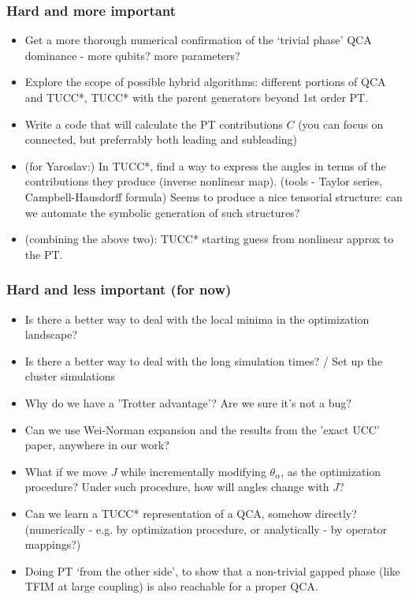 \documentclass[10pt, a4paper]{article}
\begin{document}
\subsubsection*{Hard and more important}
\begin{itemize}
\item Get a more thorough numerical confirmation of the `trivial phase' QCA dominance - more qubits? more parameters?
\item Explore the scope of possible hybrid algorithms: different portions of QCA and TUCC*, TUCC* with the parent generators beyond 1st order PT.
\item Write a code that will calculate the PT contributions $C$ (you can focus on connected, but preferrably both leading and subleading)
\item (for Yaroslav:) In TUCC*, find a way to express the angles in terms of the contributions they produce (inverse nonlinear map). (tools - Taylor series, Campbell-Hausdorff formula) Seems to produce a nice tensorial structure: can we automate the symbolic generation of such structures?
\item (combining the above two): TUCC* starting guess from nonlinear approx to the PT.
\end{itemize}

\subsubsection*{Hard and less important (for now)}
\begin{itemize}

\item Is there a better way to deal with the local minima in the optimization landscape?
\item Is there a better way to deal with the long simulation times? / Set up the cluster simulations
\item Why do we have a 'Trotter advantage'? Are we sure it's not a bug?
\item Can we use Wei-Norman expansion and the results from the 'exact UCC' paper, anywhere in our work?
\item What if we move $J$ while incrementally modifying $\theta_{\alpha}$, as the optimization procedure? Under such procedure, how will angles change with $J$?
\item Can we learn a TUCC* representation of a QCA, somehow directly? (numerically - e.g. by optimization procedure, or analytically - by operator mappings?)

\item Doing PT `from the other side', to show that a non-trivial gapped phase (like TFIM at large coupling) is also reachable for a proper QCA.

\end{itemize}
\end{document}
